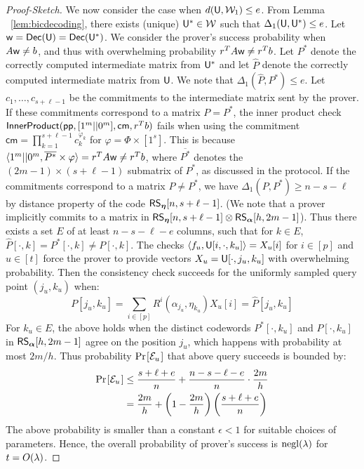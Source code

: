 \begin{proof}[Proof-Sketch]
We now consider the case when $d(\mathsf{U},\mathcal{W}_1)\leq e$. From Lemma
~\ref{lem:bicdecoding}, there exists (unique) $\mathsf{U}^*\in \mathcal{W}$
such that $\Delta_1(\mathsf{U},\mathsf{U}^*)\leq e$.
Let $\mathsf{w}=\mathsf{Dec}(\mathsf{U})=\mathsf{Dec}(\mathsf{U}^*)$. We consider the prover's success
probability when $A\mathsf{w}\neq b$, and thus with overwhelming probability $r^TA \mathsf{w} \neq
r^Tb$. Let $P^*$ denote the correctly computed intermediate matrix from $\mathsf{U}^*$ and let
$\hat{P}$ denote the correctly computed intermediate matrix from $\mathsf{U}$. We note that
$\Delta_1(\hat{P},P^*)\leq e$. Let $c_1,\ldots,c_{s+\ell-1}$ be the commitments
to the intermediate matrix sent by the prover. If these commitments correspond to a
matrix $P=P^*$, the inner product check
$\mathsf{InnerProduct}(\mathsf{pp},[1^m||0^m],\mathsf{cm},r^Tb)$ fails when using the
commitment $\mathsf{cm}=\prod_{k=1}^{s+\ell-1}c_k^{\varphi_k}$ for
$\varphi=\Phi\times [1^s]$. This is because $\langle 1^m||0^m,\overline{P^*}\times
\varphi\rangle=r^TA\mathsf{w}\neq r^Tb$, where $\overline{P^*}$ denotes the
$(2m-1)\times (s+\ell-1)$ submatrix of $P^*$,
as discussed in the protocol. If the
commitments correspond  to a matrix $P\neq P^*$, we have
$\Delta_1(P,P^*)\geq n-s-\ell$ by distance property of the code
$\mathsf{RS}_{\bm{\eta}}[n, s+\ell-1]$. 
(We note that a prover implicitly commits to a matrix in
$\mathsf{RS}_{\bm{\eta}}[n,s+\ell-1]\otimes \mathsf{RS}_{\bm{\alpha}}[h,2m-1]$).
Thus there exists a set $E$ of at least $n-s-\ell-e$ columns, such that for
$k\in E$, $\hat{P}[\cdot,k]=P^*[\cdot,k]\neq P[\cdot,k]$. The checks
$\langle f_u,\mathsf{U}[i,\cdot,k_u]\rangle=X_u[i]$ for $i\in [p]$ and $u\in [t]$ 
force the prover to provide vectors $X_u=\mathsf{U}[\cdot,j_u,k_u]$ with
overwhelming probability. Then the consistency check succeeds for the 
uniformly sampled query point $(j_u,k_u)$ when:
\[ P[j_u,k_u] = \sum_{i\in [p]}R^i(\alpha_{j_u},\eta_{k_u})X_u[i] =
\hat{P}[j_u,k_u] \]
For $k_u\in E$, the above holds when the distinct codewords $P^*[\cdot,k_u]$ and
$P[\cdot,k_u]$ in $\mathsf{RS}_{\bm{\alpha}}[h,2m-1]$ agree on the position $j_u$, which happens with 
probability at most $2m/h$. Thus probability $\prob{\mc{E}_u}$ that above query succeeds is bounded by:
{\small
\begin{align*}
\prob{\mc{E}_u}&\leq \frac{s+\ell+e}{n} + \frac{n-s-\ell-e}{n}\cdot\frac{2m}{h}
\\
&= \frac{2m}{h}+\left(1-\frac{2m}{h}\right)\left(\frac{s+\ell+e}{n}\right)
\end{align*}
}
The above probability is smaller than a constant $\epsilon<1$ for suitable
choices of parameters. Hence, the overall probability of prover's success is
$\mathrm{negl}(\lambda)$ for $t=O(\lambda)$.
\end{proof}
